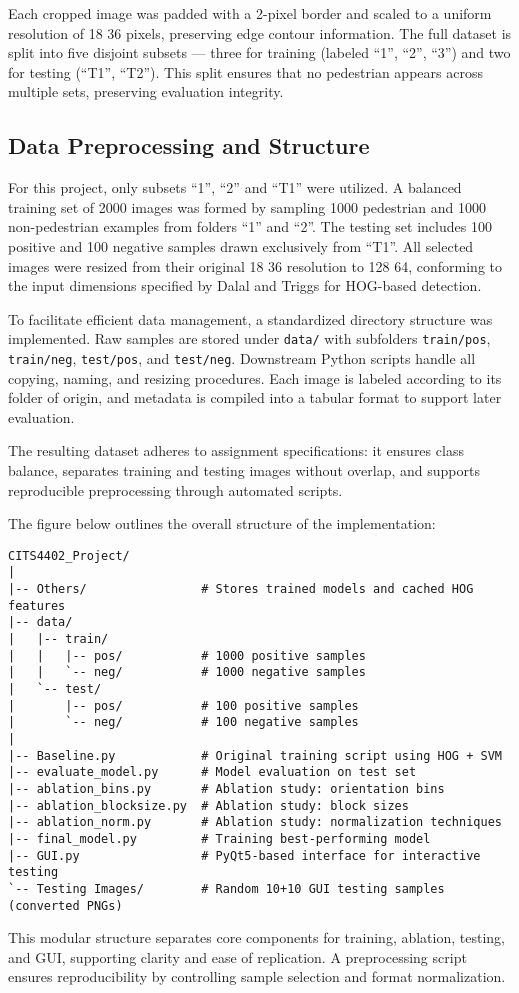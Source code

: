 \documentclass[10pt, onecolumn, a4paper]{article}
\begin{document}
Each cropped image was padded with a 2-pixel border and scaled to a uniform resolution of 18\,\texttimes\,36 pixels, preserving edge contour information. 
The full dataset is split into five disjoint subsets — three for training (labeled ``1'', ``2'', ``3'') and two for testing (``T1'', ``T2''). 
This split ensures that no pedestrian appears across multiple sets, preserving evaluation integrity.
\vspace{-0.5em}
\subsection{Data Preprocessing and Structure}
\vspace{-0.5em}
For this project, only subsets ``1'', ``2'' and ``T1'' were utilized. 
A balanced training set of 2000 images was formed by sampling 1000 pedestrian and 1000 non-pedestrian examples from folders ``1'' and ``2''. 
The testing set includes 100 positive and 100 negative samples drawn exclusively from ``T1''. 
All selected images were resized from their original 18\,\texttimes\,36 resolution to 128\,\texttimes\,64, 
conforming to the input dimensions specified by Dalal and Triggs \cite{1467360} for HOG-based detection.

To facilitate efficient data management, a standardized directory structure was implemented. 
Raw samples are stored under \texttt{data/} with subfolders \texttt{train/pos}, \texttt{train/neg}, \texttt{test/pos}, and \texttt{test/neg}. 
Downstream Python scripts handle all copying, naming, and resizing procedures. Each image is labeled according to its folder of origin, 
and metadata is compiled into a tabular format to support later evaluation.

The resulting dataset adheres to assignment specifications: it ensures class balance, 
separates training and testing images without overlap, and supports reproducible preprocessing through automated scripts.

The figure below outlines the overall structure of the implementation:
{\footnotesize
\begin{verbatim}
CITS4402_Project/
|
|-- Others/                # Stores trained models and cached HOG features
|-- data/
|   |-- train/
|   |   |-- pos/           # 1000 positive samples
|   |   `-- neg/           # 1000 negative samples
|   `-- test/
|       |-- pos/           # 100 positive samples
|       `-- neg/           # 100 negative samples
|
|-- Baseline.py            # Original training script using HOG + SVM
|-- evaluate_model.py      # Model evaluation on test set
|-- ablation_bins.py       # Ablation study: orientation bins
|-- ablation_blocksize.py  # Ablation study: block sizes
|-- ablation_norm.py       # Ablation study: normalization techniques
|-- final_model.py         # Training best-performing model
|-- GUI.py                 # PyQt5-based interface for interactive testing
`-- Testing Images/        # Random 10+10 GUI testing samples (converted PNGs)
\end{verbatim}
}
This modular structure separates core components for training, ablation, testing, and GUI, supporting clarity and ease of replication. 
A preprocessing script ensures reproducibility by controlling sample selection and format normalization.
\end{document}
